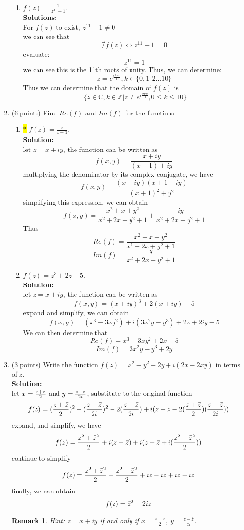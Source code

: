 \documentclass[12pt]{article}
\newtheorem*{remark}{Remark}
\begin{document}
\begin{enumerate}
\begin{enumerate}
    
    \item $f(z) = \frac{1}{z^{11} - 1}$.\\
    \textbf{Solutions:}\\
    For $f(z)$ to exist, $z^{11}-1\neq0$\\
    we can see that
    \[
    \nexists f(z) \iff z^{11}-1=0
    \]
    evaluate:\[
    z^{11}=1
    \]
    we can see this is the 11th roots of unity. Thus, we can determine:\[
    z=e^{i\frac{2\pi k}{11}},k\in\{0,1,2...10\}
    \]
    Thus we can determine that the domain of $f(z)$ is\[
    \
    \{z\in\mathbb{C},k\in \mathbb{Z}|z\neq e^{i\frac{2\pi k}{11}},0\leq k\leq 10\}
    \]
\end{enumerate}


\item (6 points)  Find $Re(f)$ and $Im(f)$ for the functions 
\begin{enumerate}
    \item  \colorbox{yellow}{$\ast$}  $f(z) = \frac{z}{z+1}$.\\
    \textbf{Solution:}\\
    let $z=x+iy$, the function can be written as\[
    f(x,y)=\frac{x+iy}{(x+1)+iy}
    \]
    multiplying the denominator by its complex conjugate, we have\[
    f(x,y)=\frac{(x+iy)(x+1-iy)}{(x+1)^2+y^2}
    \]
    simplifying this expression, we can obtain\[
    f(x,y)=\frac{x^2+x+y^2}{x^2+2x+y^2+1}+\frac{iy}{x^2+2x+y^2+1}
    \]
    Thus\[
    Re(f)=\frac{x^2+x+y^2}{x^2+2x+y^2+1}
    \]
    \[
    Im(f)=\frac{y}{x^2+2x+y^2+1}
    \]
    
    \item $f(z) = z^{3} + 2z -5$.  \\
    \textbf{Solution:}\\
    let $z=x+iy$, the function can be written as\[
    f(x,y)=(x+iy)^3+2(x+iy)-5
    \]
    expand and simplify, we can obtain\[
    f(x,y)=\left(x^3-3xy^2\right)+i\left(3x^2y-y^3\right)+2x+2iy-5
    \]
    We can then determine that\[
    Re(f)=x^3-3xy^2+2x-5\]\[
    Im(f)=3x^2y-y^3+2y
    \]
    
\end{enumerate} 

\item (3 points)  Write the function $f(z)= x^{2} - y^{2} - 2y + i (2x-2xy)$ in terms of $z$.\\
\textbf{Solution:}\\
let $x=\frac{z+\Bar{z}}{2}$ and $y=\frac{z-\Bar{z}}{2i}$, substitute to the original function\[
f(z)=(\frac{z+\Bar{z}}{2})^2-(\frac{z-\Bar{z}}{2i})^2-2(\frac{z-\Bar{z}}{2i})+i(z+\Bar{z}-2(\frac{z+\Bar{z}}{2})(\frac{z-\Bar{z}}{2i}))
\]
expand, and simplify, we have\[
f(z)=\frac{z^2+\Bar{z}^2}{2}+i(z-\Bar{z})+i(z+\Bar{z}+i(\frac{z^2-\Bar{z}^2}{2}))
\]
continue to simplify\[
f(z)=\frac{z^2+\Bar{z}^2}{2}-\frac{z^2-\Bar{z}^2}{2}+iz-i\Bar{z}+iz+i\Bar{z}
\]
finally, we can obtain
\[
f(z)=\Bar{z}^2+2iz
\]

\begin{remark}
    Hint: $z = x + iy$ if and only if $x = \frac{z + \bar{z}}{2}, \; y = \frac{ z - \bar{z}}{2i}$. 
\end{remark}


\end{enumerate} 
\end{document}
